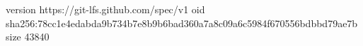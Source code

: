 version https://git-lfs.github.com/spec/v1
oid sha256:78cc1e4edabda9b734b7e8b9b6bad360a7a8c09a6c5984f670556bdbbd79ae7b
size 43840
